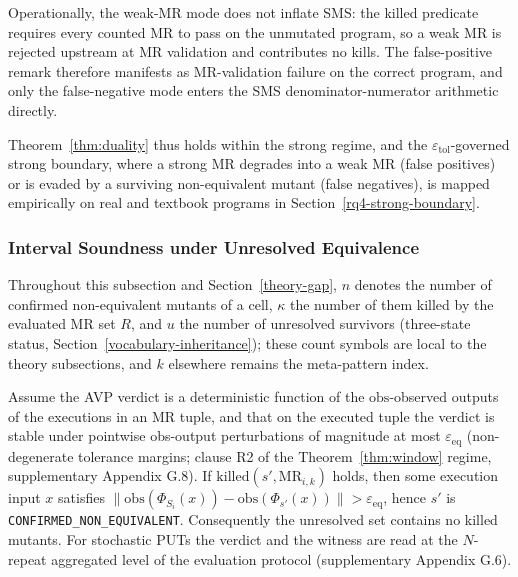 \documentclass[manuscript,screen,review]{acmart}
\begin{document}
Operationally, the weak-MR mode does not inflate SMS: the killed
predicate requires every counted MR to pass on the unmutated program, so
a weak MR is rejected upstream at MR validation and contributes no
kills. The false-positive remark therefore manifests as MR-validation
failure on the correct program, and only the false-negative mode enters
the SMS denominator-numerator arithmetic directly.

Theorem~\ref{thm:duality} thus holds within the strong regime, and the
$\varepsilon_{\mathrm{tol}}$-governed strong boundary, where a strong
MR degrades into a weak MR (false positives) or is evaded by a surviving
non-equivalent mutant (false negatives), is mapped empirically on real
and textbook programs in Section~\ref{rq4-strong-boundary}.

\subsubsection{Interval Soundness under Unresolved Equivalence}\label{theory-interval}

Throughout this subsection and Section~\ref{theory-gap}, $n$ denotes the
number of confirmed non-equivalent mutants of a cell, $\kappa$ the
number of them killed by the evaluated MR set $R$, and $u$ the number of
unresolved survivors (three-state status,
Section~\ref{vocabulary-inheritance}); these count symbols are local to
the theory subsections, and $k$ elsewhere remains the meta-pattern
index.

\begin{lemma}\label{lem:witness}
Assume the AVP verdict is a deterministic function of the
$\mathrm{obs}$-observed outputs of the executions in an MR tuple, and
that on the executed tuple the verdict is stable under pointwise
obs-output perturbations of magnitude at most
$\varepsilon_{\mathrm{eq}}$ (non-degenerate tolerance margins; clause R2
of the Theorem~\ref{thm:window} regime, supplementary Appendix G.8). If
$\mathrm{killed}(s', \mathrm{MR}_{i,k})$ holds, then some execution
input $x$ satisfies
$\|\mathrm{obs}(\Phi_{S_i}(x)) - \mathrm{obs}(\Phi_{s'}(x))\| > \varepsilon_{\mathrm{eq}}$,
hence $s'$ is \texttt{CONFIRMED\_NON\_EQUIVALENT}. Consequently the
unresolved set contains no killed mutants. For stochastic PUTs the
verdict and the witness are read at the $N$-repeat aggregated level of
the evaluation protocol (supplementary Appendix G.6).
\end{lemma}
\end{document}
